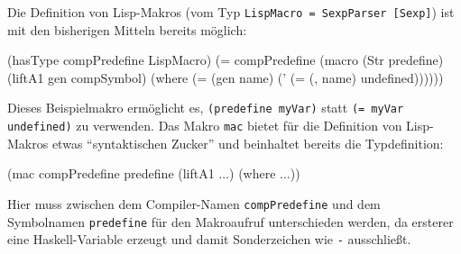 \documentclass[12pt, a4paper, bibgerm]{scrbook}
\newenvironment{DIFnomarkup}{}{}
\newcommand\icode[1]{\lstinline?#1?}
\begin{document}
Die Definition von Lisp-Makros (vom Typ \icode{LispMacro = SexpParser [Sexp]}) ist mit
den bisherigen Mitteln bereits möglich:
\begin{DIFnomarkup}\begin{code}
(hasType compPredefine LispMacro)
(= compPredefine (macro (Str predefine)
                     (liftA1 gen compSymbol)
                   (where (= (gen name)
                             (' (= (, name) undefined))))))

\end{code}\end{DIFnomarkup}
Dieses Beispielmakro ermöglicht es, \icode{(predefine myVar)} statt
\icode{(= myVar undefined)} zu verwenden. Das Makro \icode{mac} bietet
für die Definition von Lisp-Makros etwas ``syntaktischen Zucker'' und
beinhaltet bereits die Typdefinition:
\begin{DIFnomarkup}\begin{code}
(mac compPredefine predefine
     (liftA1 ...)
   (where ...))
\end{code}\end{DIFnomarkup}
Hier muss zwischen dem Compiler-Namen \icode{compPredefine} und dem
Symbolnamen \icode{predefine} für den Makroaufruf unterschieden werden,
da ersterer eine Haskell-Variable erzeugt und damit Sonderzeichen wie
\icode{-} ausschließt.
\end{document}
